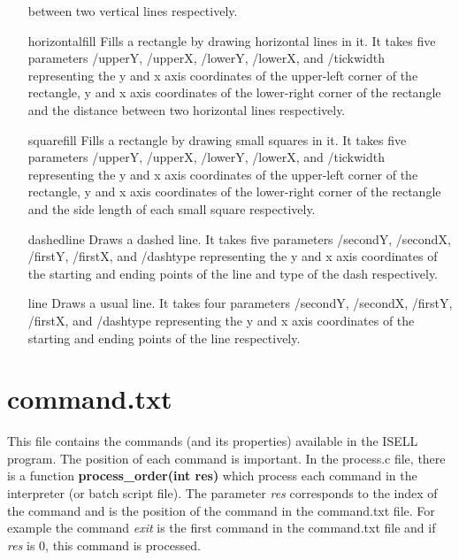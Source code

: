 \documentclass[a4paper,12pt]{book}
\begin{document}
\begin{itemize}
between two vertical lines respectively.
\item[horizontalfill] Fills a rectangle by drawing horizontal lines in it. It takes five parameters /upperY, /upperX, /lowerY, /lowerX, and /tickwidth representing the y and x axis coordinates of the upper-left corner of the rectangle, y and x axis coordinates of the lower-right corner of the rectangle and the distance between two horizontal lines respectively.
\item[squarefill] Fills a rectangle by drawing small squares in it. It takes five parameters /upperY, /upperX, /lowerY, /lowerX, and /tickwidth representing the y and x axis coordinates of the upper-left corner of the rectangle, y and x axis coordinates of the lower-right corner of the rectangle and the side length
of each small square respectively.
\item[dashedline] Draws a dashed line. It takes five parameters /secondY, /secondX, /firstY, /firstX, and /dashtype representing the y and x axis coordinates of the starting and ending points of the line and type of the dash respectively.
\item[line] Draws a usual line. It takes four parameters /secondY, /secondX, /firstY, /firstX, and /dashtype representing the y and x axis coordinates of the starting and ending points of the line respectively.
\end{itemize}

\section{command.txt}
This file contains the commands (and its properties) available in the ISELL program. The position of each command is important. In the process.c file, there is a function {\bf process\_order(int res)} which process each command in the interpreter (or batch script file). The parameter {\em res} corresponds to the index of the command and is the position of the command in the command.txt file. For example the command {\em exit} is the first command in the command.txt file and if {\em res} is 0, this command is processed.
\end{document}
